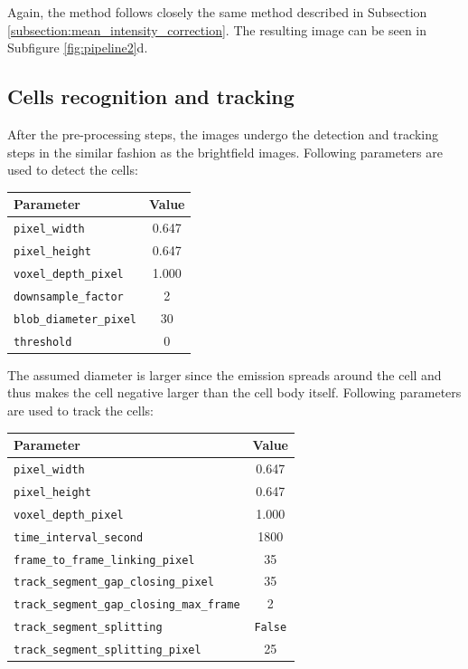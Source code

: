 \documentclass[pdftex,12pt,a4paper]{report}
\begin{document}
Again, the method follows closely the same method described in Subsection \ref{subsection:mean_intensity_correction}. The resulting image can be seen in Subfigure \ref{fig:pipeline2}d.

\subsection{Cells recognition and tracking}

After the pre-processing steps, the images undergo the detection and tracking steps in the similar fashion as the brightfield images. Following parameters are used to detect the cells:

\begin{table}[H]
\centering
\begin{tabular}[t]{ l | c }
Parameter & Value \\
\hline
\texttt{pixel\_width} & 0.647 \\
\texttt{pixel\_height} & 0.647 \\
\texttt{voxel\_depth\_pixel} & 1.000 \\
\texttt{downsample\_factor} & 2 \\
\texttt{blob\_diameter\_pixel} & 30 \\
\texttt{threshold} & 0 \\
\end{tabular}
\end{table}

The assumed diameter is larger since the emission spreads around the cell and thus makes the cell negative larger than the cell body itself. Following parameters are used to track the cells:

\begin{table}[H]
\centering
\begin{tabular}[t]{ l | c }
Parameter & Value \\
\hline
\texttt{pixel\_width} & 0.647 \\
\texttt{pixel\_height} & 0.647 \\
\texttt{voxel\_depth\_pixel} & 1.000 \\
\texttt{time\_interval\_second} & 1800\\
\texttt{frame\_to\_frame\_linking\_pixel} & 35 \\
\texttt{track\_segment\_gap\_closing\_pixel} & 35 \\
\texttt{track\_segment\_gap\_closing\_max\_frame} & 2 \\
\texttt{track\_segment\_splitting} & \texttt{False} \\
\texttt{track\_segment\_splitting\_pixel} & 25 \\
\end{tabular}
\end{table}
\end{document}

